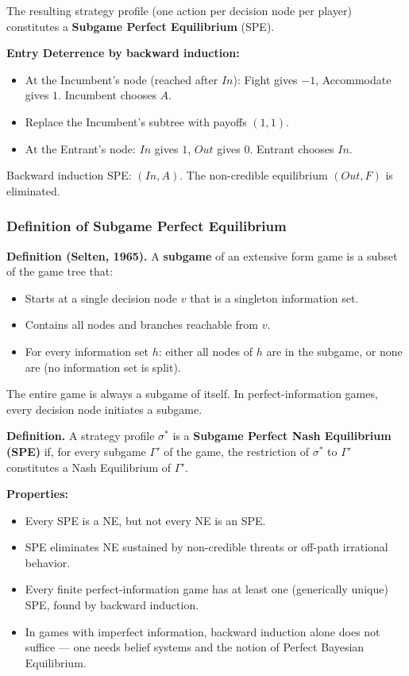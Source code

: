 \documentclass[hidelinks]{article}
\begin{document}
The resulting strategy profile (one action per decision node per player) constitutes a \textbf{Subgame Perfect Equilibrium} (SPE).

\textbf{Entry Deterrence by backward induction:}
\begin{itemize}
    \item At the Incumbent's node (reached after $In$): Fight gives $-1$, Accommodate gives $1$. Incumbent chooses $A$.
    \item Replace the Incumbent's subtree with payoffs $(1,1)$.
    \item At the Entrant's node: $In$ gives $1$, $Out$ gives $0$. Entrant chooses $In$.
\end{itemize}

Backward induction SPE: $(In, A)$. The non-credible equilibrium $(Out, F)$ is eliminated.

\subsubsection{Definition of Subgame Perfect Equilibrium}

\textbf{Definition (Selten, 1965).} A \textbf{subgame} of an extensive form game is a subset of the game tree that:
\begin{itemize}
    \item Starts at a single decision node $v$ that is a singleton information set.
    \item Contains all nodes and branches reachable from $v$.
    \item For every information set $h$: either all nodes of $h$ are in the subgame, or none are (no information set is split).
\end{itemize}

The entire game is always a subgame of itself. In perfect-information games, every decision node initiates a subgame.

\textbf{Definition.} A strategy profile $\sigma^*$ is a \textbf{Subgame Perfect Nash Equilibrium (SPE)} if, for every subgame $\Gamma'$ of the game, the restriction of $\sigma^*$ to $\Gamma'$ constitutes a Nash Equilibrium of $\Gamma'$.

\textbf{Properties:}
\begin{itemize}
    \item Every SPE is a NE, but not every NE is an SPE.
    \item SPE eliminates NE sustained by non-credible threats or off-path irrational behavior.
    \item Every finite perfect-information game has at least one (generically unique) SPE, found by backward induction.
    \item In games with imperfect information, backward induction alone does not suffice — one needs belief systems and the notion of Perfect Bayesian Equilibrium.
\end{itemize}
\end{document}
